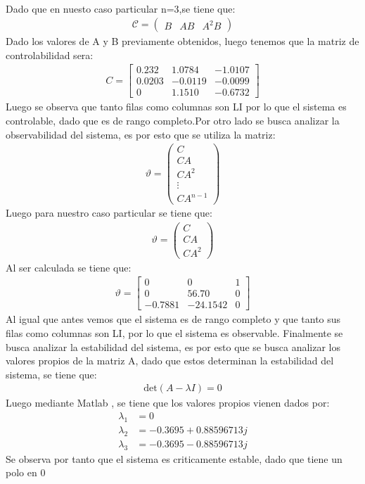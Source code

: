 \begin{itemize}
\begin{align}
\end{align}
Dado que en nuesto caso particular n=3,se tiene que:
\begin{align}
	\mathcal{C} = \begin{pmatrix} B & AB & A^{2}B\end{pmatrix}
\end{align}
Dado los valores de A y B previamente obtenidos, luego tenemos que la matriz de controlabilidad sera:
\begin{align}
	C = \begin{bmatrix}
		0.232 & 1.0784 & -1.0107 \\
		0.0203 & -0.0119 & -0.0099 \\
		0 & 1.1510 & -0.6732
	\end{bmatrix}
	\end{align}
Luego se observa que tanto filas como columnas son LI por lo que el sistema es controlable, dado que es de rango completo.Por otro lado se busca analizar la observabilidad del sistema, es por esto que se utiliza la matriz:
\begin{align}
	\vartheta = \begin{pmatrix} C \\ CA \\ CA^{2} \\ \vdots \\ CA^{n-1} \end{pmatrix}
\end{align}
Luego para nuestro caso particular se tiene que:
\begin{align}
	\vartheta = \begin{pmatrix} C \\ CA \\ CA^{2} \end{pmatrix}
\end{align}
Al ser calculada se tiene que:
\begin{align}
	\vartheta = \begin{bmatrix}
		0 & 0 & 1 \\
		0 & 56.70 & 0 \\
		-0.7881 & -24.1542 & 0
	\end{bmatrix}
\end{align}
Al igual que antes vemos que el sistema es de rango completo y que tanto sus filas como columnas son LI, por lo que el sistema es observable. Finalmente se busca analizar la estabilidad del sistema, es por esto que se busca analizar los valores propios de la matriz A, dado que estos determinan la estabilidad del sistema, se tiene que:
\begin{align}
	\text{det}(A - \lambda I) = 0
\end{align}
Luego mediante Matlab , se tiene que los valores propios vienen dados por:
\begin{align}
	\lambda_{1} &= 0\\
	\lambda_{2} &= −0.3695+0.88596713j\\
	\lambda_{3} &= −0.3695-0.88596713j
\end{align}
Se observa por tanto que el sistema es criticamente estable, dado que tiene un polo en 0


\end{itemize}

